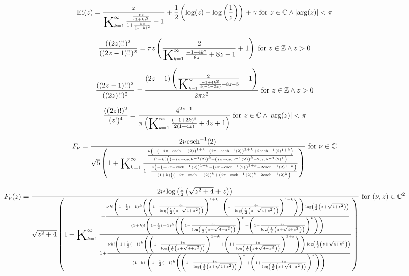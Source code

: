 \documentclass{article}
\newcommand{\bigK}{\mathop{\raisebox{-5pt}{\huge K}}}
\begin{document}
\[\text{Ei}(z)=\frac{z}{\bigK_{k=1}^{\infty}\frac{-\frac{k z}{(1+k)^2}}{1+\frac{k z}{(1+k)^2}}+1}+\frac{1}{2} \left(\log (z)-\log \left(\frac{1}{z}\right)\right)+\gamma \text{ for }z\in \mathbb{C}\land \left| \arg (z)\right| <\pi\] 

\[\frac{((2 z)\text{!!})^2}{((2 z-1)\text{!!})^2}=\pi  z \left(\frac{2}{\bigK_{k=1}^{\infty}\frac{-1+4 k^2}{8 z}+8 z-1}+1\right)\text{ for }z\in \mathbb{Z}\land z>0\] 

\[\frac{((2 z-1)\text{!!})^2}{((2 z)\text{!!})^2}=\frac{(2 z-1) \left(\frac{2}{\bigK_{k=1}^{\infty}\frac{-1+4 k^2}{4 (-1+2 z)}+8 z-5}+1\right)}{2 \pi  z^2}\text{ for }z\in \mathbb{Z}\land z>0\] 

\[\frac{((2 z)!)^2}{(z!)^4}=\frac{4^{2 z+1}}{\pi  \left(\bigK_{k=1}^{\infty}\frac{(-1+2 k)^2}{2 (1+4 z)}+4 z+1\right)}\text{ for }z\in \mathbb{C}\land \left| \arg (z)\right| <\pi\] 

\[F_{\nu }=\frac{2 \nu  \text{csch}^{-1}(2)}{\sqrt{5} \left(1+\bigK_{k=1}^{\infty}\frac{\frac{\nu  \left(-\left(-i \pi -\text{csch}^{-1}(2)\right)^{1+k}-\left(i \pi -\text{csch}^{-1}(2)\right)^{1+k}+2 \text{csch}^{-1}(2)^{1+k}\right)}{(1+k) \left(\left(-i \pi -\text{csch}^{-1}(2)\right)^k+\left(i \pi -\text{csch}^{-1}(2)\right)^k-2 \text{csch}^{-1}(2)^k\right)}}{1-\frac{\nu  \left(-\left(-i \pi -\text{csch}^{-1}(2)\right)^{1+k}-\left(i \pi -\text{csch}^{-1}(2)\right)^{1+k}+2 \text{csch}^{-1}(2)^{1+k}\right)}{(1+k) \left(\left(-i \pi -\text{csch}^{-1}(2)\right)^k+\left(i \pi -\text{csch}^{-1}(2)\right)^k-2 \text{csch}^{-1}(2)^k\right)}}\right)}\text{ for }\nu \in \mathbb{C}\] 

\[F_{\nu }(z)=\frac{2 \nu  \log \left(\frac{1}{2} \left(\sqrt{z^2+4}+z\right)\right)}{\sqrt{z^2+4} \left(1+\bigK_{k=1}^{\infty}\frac{-\frac{\nu  k! \left(1+\frac{1}{2} (-1)^k \left(\left(1-\frac{i \pi }{\log \left(\frac{1}{2} \left(z+\sqrt{4+z^2}\right)\right)}\right)^{1+k}+\left(1+\frac{i \pi }{\log \left(\frac{1}{2} \left(z+\sqrt{4+z^2}\right)\right)}\right)^{1+k}\right)\right) \log \left(\frac{1}{2} \left(z+\sqrt{4+z^2}\right)\right)}{(1+k)! \left(1-\frac{1}{2} (-1)^k \left(\left(1-\frac{i \pi }{\log \left(\frac{1}{2} \left(z+\sqrt{4+z^2}\right)\right)}\right)^k+\left(1+\frac{i \pi }{\log \left(\frac{1}{2} \left(z+\sqrt{4+z^2}\right)\right)}\right)^k\right)\right)}}{1+\frac{\nu  k! \left(1+\frac{1}{2} (-1)^k \left(\left(1-\frac{i \pi }{\log \left(\frac{1}{2} \left(z+\sqrt{4+z^2}\right)\right)}\right)^{1+k}+\left(1+\frac{i \pi }{\log \left(\frac{1}{2} \left(z+\sqrt{4+z^2}\right)\right)}\right)^{1+k}\right)\right) \log \left(\frac{1}{2} \left(z+\sqrt{4+z^2}\right)\right)}{(1+k)! \left(1-\frac{1}{2} (-1)^k \left(\left(1-\frac{i \pi }{\log \left(\frac{1}{2} \left(z+\sqrt{4+z^2}\right)\right)}\right)^k+\left(1+\frac{i \pi }{\log \left(\frac{1}{2} \left(z+\sqrt{4+z^2}\right)\right)}\right)^k\right)\right)}}\right)}\text{ for }(\nu ,z)\in \mathbb{C}^2\] 
\end{document}
